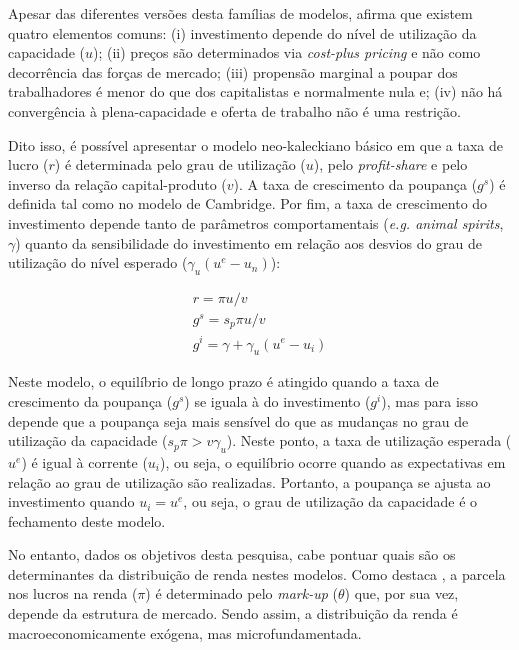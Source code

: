 Apesar das diferentes versões desta famílias de modelos, \textcite[p.~360]{lavoie_post-keynesian_2014} afirma que existem quatro elementos comuns: (i) investimento depende do nível de utilização da capacidade ($u$); (ii) preços são determinados via \textit{cost-plus pricing} e não como decorrência das forças de mercado; (iii) propensão marginal a poupar dos trabalhadores é menor do que dos capitalistas e normalmente nula e; (iv) não há convergência à plena-capacidade e oferta de trabalho não é uma restrição.

Dito isso, é possível apresentar o modelo neo-kaleckiano básico em que a taxa de lucro ($r$) é determinada pelo grau de utilização ($u$), pelo \textit{profit-share} e pelo inverso da relação capital-produto ($v$). A taxa de crescimento da poupança ($g^s$) é definida tal como no modelo de Cambridge. Por fim, a taxa de crescimento do investimento depende tanto de parâmetros comportamentais (\textit{e.g. animal spirits}, $\gamma$) quanto da sensibilidade do investimento em relação aos desvios do grau de utilização do nível esperado ($\gamma_u(u^e-u_n)$):
 
\begin{equation}
\begin{array}{ll}
r = \pi u / v\\
g^s = s_p\pi u/v\\
g^i = \gamma + \gamma_u(u^e-u_i)
\end{array}
\end{equation}

Neste modelo, o equilíbrio de longo prazo é atingido quando a taxa de crescimento da poupança ($g^s$) se iguala à do investimento ($g^i$), mas para isso depende que a poupança seja mais sensível do que as mudanças no grau de utilização da capacidade ($s_p\pi > v\gamma_u$). Neste ponto, a taxa de utilização esperada ($u^e$) é igual à corrente ($u_i$), ou seja, o equilíbrio ocorre quando as expectativas em relação ao grau de utilização são realizadas. Portanto, a poupança se ajusta ao investimento quando $u_i = u^e$, ou seja, o grau de utilização da capacidade é o fechamento deste modelo.

No entanto, dados os objetivos desta pesquisa, cabe pontuar quais são os determinantes da distribuição de renda nestes modelos. Como destaca \textcite[Capítulo 5]{hein_distribution_2014}, a parcela nos lucros na renda ($\pi$) é determinado pelo \textit{mark-up} ($\theta$) que, por sua vez, depende da estrutura de mercado. Sendo assim, a distribuição da renda é macroeconomicamente exógena, mas microfundamentada.

